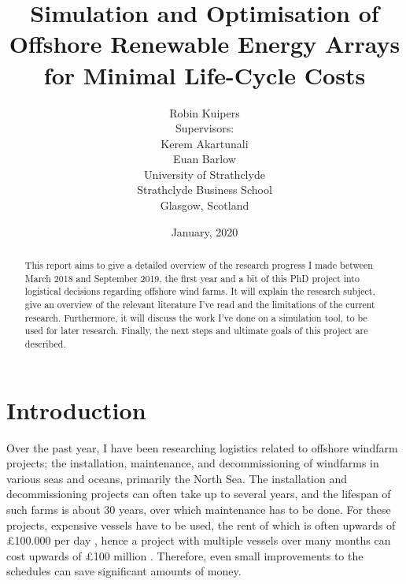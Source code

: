 \documentclass[a4paper,12pt]{article}
\begin{document}
\title{Simulation and Optimisation of Offshore Renewable Energy Arrays for Minimal Life-Cycle Costs}
\author{Robin Kuipers \\[1cm] Supervisors: \\ Kerem Akartunali \\ Euan Barlow\\[2cm] University of Strathclyde \\ Strathclyde Business School \\ {\small Glasgow, Scotland}}
\date{January, 2020}

\maketitle

\pagebreak

\begin{abstract}
This report aims to give a detailed overview of the research progress I made between March 2018 and September 2019, the first year and a bit of this PhD project into logistical decisions regarding offshore wind farms. It will explain the research subject, give an overview of the relevant literature I've read and the limitations of the current research. Furthermore, it will discuss the work I've done on a simulation tool, to be used for later research. Finally, the next steps and ultimate goals of this project are described. 
\end{abstract}

\pagebreak

\tableofcontents

\pagebreak

\section{Introduction} \label{s:intro}
Over the past year, I have been researching logistics related to offshore windfarm projects; the installation, maintenance, and decommissioning of windfarms in various seas and oceans, primarily the North Sea. The installation and decommissioning projects can often take up to several years, and the lifespan of such farms is about 30 years, over which maintenance has to be done. For these projects, expensive vessels have to be used, the rent of which is often upwards of \pounds 100.000 per day \cite{barlow2014support}, hence a project with multiple vessels over many months can cost upwards of \pounds 100 million \cite{kaiser2010offshore}. Therefore, even small improvements to the schedules can save significant amounts of money.
\end{document}
